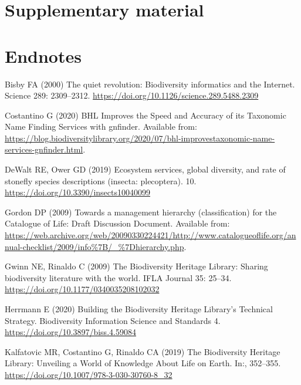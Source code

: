\documentclass[
]{article}
\newlength{\cslhangindent}
\newlength{\cslentryspacingunit} %
\newenvironment{CSLReferences}[2] %
 {%
  \setlength{\parindent}{0pt}
  \ifodd #1
  \let\oldpar\par
  \def\par{\hangindent=\cslhangindent\oldpar}
  \fi
  \setlength{\parskip}{#2\cslentryspacingunit}
 }%
 {}
\begin{document}
\hypertarget{supplementary-material}{%
\section{Supplementary material}\label{supplementary-material}}

\hypertarget{endnotes}{%
\section*{Endnotes}\label{endnotes}}

\hypertarget{refs}{}
\begin{CSLReferences}{1}{0}
\leavevmode{}%
Bisby FA (2000) {The quiet revolution: Biodiversity informatics and the
Internet}. Science 289: 2309--2312.
\url{https://doi.org/10.1126/science.289.5488.2309}

\leavevmode{}%
Costantino G (2020) {BHL Improves the Speed and Accuracy of its
Taxonomic Name Finding Services with gnfinder}. Available from:
\url{https://blog.biodiversitylibrary.org/2020/07/bhl-improvestaxonomic-name-services-gnfinder.html}.

\leavevmode{}%
DeWalt RE, Ower GD (2019) Ecosystem services, global diversity, and rate
of stonefly species descriptions (insecta: plecoptera). 10.
\url{https://doi.org/10.3390/insects10040099}

\leavevmode{}%
Gordon DP (2009) {Towards a management hierarchy (classification) for
the Catalogue of Life: Draft Discussion Document}. Available from:
\url{https://web.archive.org/web/20090330224421/http://www.catalogueoflife.org/annual-checklist/2009/info\%7B/_\%7Dhierarchy.php}.

\leavevmode{}%
Gwinn NE, Rinaldo C (2009) {The Biodiversity Heritage Library: Sharing
biodiversity literature with the world}. IFLA Journal 35: 25--34.
\url{https://doi.org/10.1177/0340035208102032}

\leavevmode{}%
Herrmann E (2020) {Building the Biodiversity Heritage Library's
Technical Strategy}. Biodiversity Information Science and Standards 4.
\url{https://doi.org/10.3897/biss.4.59084}

\leavevmode{}%
Kalfatovic MR, Costantino G, Rinaldo CA (2019) {The Biodiversity
Heritage Library: Unveiling a World of Knowledge About Life on Earth}.
In:, 352--355. \url{https://doi.org/10.1007/978-3-030-30760-8_32}


\end{CSLReferences}
\end{document}
